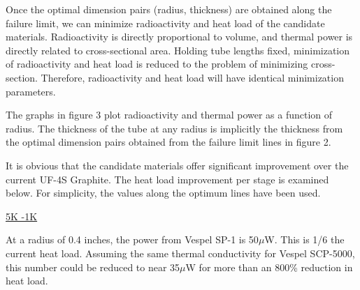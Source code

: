 \documentclass{report}
\begin{document}
Once the optimal dimension pairs (radius, thickness) are obtained along the failure limit, we can minimize radioactivity and heat load of the candidate materials. Radioactivity is
directly proportional to volume, and thermal power is directly related to cross-sectional area. Holding tube lengths fixed, minimization of radioactivity and heat load is reduced
to the problem of minimizing cross-section. Therefore, radioactivity and heat load will have identical minimization parameters.

The graphs in figure 3 plot radioactivity and thermal power as a function of radius. The thickness of the tube at any radius is implicitly the thickness from the optimal dimension
pairs obtained from the failure limit lines in figure 2.


It is obvious that the candidate materials offer significant improvement over the current UF-4S Graphite. The heat load improvement per stage is examined below. For simplicity,
the values along the optimum lines have been used.

\smallskip

\large{\underline{5K -1K}}

At a radius of 0.4 inches, the power from Vespel SP-1 is 50$\mu$W. This is 1/6 the current heat load. Assuming the same thermal conductivity for Vespel SCP-5000, this number could
be reduced to near 35$\mu$W for more than an 800\% reduction in heat load.
\end{document}
